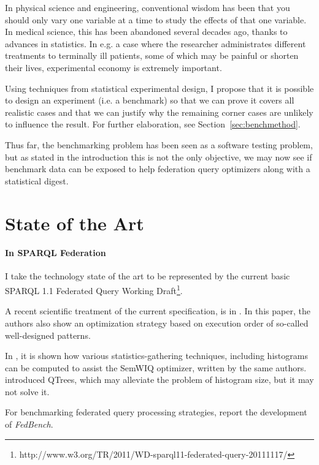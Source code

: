 \documentclass{llncs}
\begin{document}
In physical science and engineering, conventional wisdom has been that
you should only vary one variable at a time to study the effects of
that one variable. In medical science, this has been abandoned several
decades ago, thanks to advances in statistics. In e.g. a case where
the researcher administrates different treatments to terminally ill
patients, some of which may be painful or shorten their lives,
experimental economy is extremely important.

Using techniques from statistical experimental design, I propose
that it is possible to design an experiment (i.e. a benchmark) so that
we can prove it covers all realistic cases and that we can justify
why the remaining corner cases are unlikely to influence the
result. For further elaboration, see Section~\ref{sec:benchmethod}.

Thus far, the benchmarking problem has been seen as a software testing
problem, but as stated in the introduction this is not the only
objective, we may now see if benchmark data can be exposed to help
federation query optimizers along with a statistical digest.

\section{State of the Art}

\paragraph{In SPARQL Federation}

I take the technology state of the art to be represented by the
current basic SPARQL 1.1 Federated Query Working
Draft\footnote{http://www.w3.org/TR/2011/WD-sparql11-federated-query-20111117/}. 

A recent scientific treatment of the current specification, is in
\cite{springerlink:10.1007/978-3-642-21064-8-1}. In this paper, the
authors also show an optimization strategy based on execution order of
so-called well-designed patterns.

In \cite{5337556}, it is shown how various statistics-gathering
techniques, including histograms can be computed to assist the SemWIQ
optimizer, written by the same authors.
\cite{Harth:2010:DSO:1772690.1772733} introduced QTrees, which may
alleviate the problem of histogram size, but it may not solve it.

For benchmarking federated query processing strategies,
\cite{Schmidt:2011:FBS:2063016.2063054} report the development of \emph{FedBench}.
\end{document}

